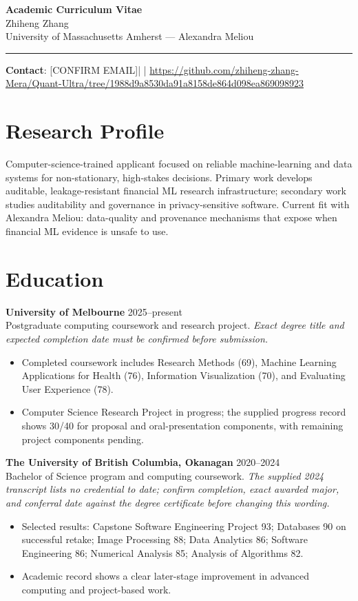 \documentclass[11pt]{article}
\newcommand{\ApplicantName}{Zhiheng Zhang}
\newcommand{\ApplicantEmail}{[CONFIRM EMAIL]}
\newcommand{\ApplicantPhone}{[CONFIRM PHONE]}
\newcommand{\ApplicantGitHub}{\url{https://github.com/zhiheng-zhang-Mera/Quant-Ultra/tree/1988d9a8530da91a8158de864d098ea869098923}}
\begin{document}
\begin{center}
{\LARGE\bfseries Academic Curriculum Vitae}\\[0.25em]
{\large \ApplicantName}\\
University of Massachusetts Amherst --- Alexandra Meliou
\end{center}
\vspace{0.35em}\hrule\vspace{0.65em}

\textbf{Contact}: \ApplicantEmail\quad | \quad \ApplicantPhone\quad | \quad \ApplicantGitHub

\section*{Research Profile}
Computer-science-trained applicant focused on reliable machine-learning and data systems for non-stationary, high-stakes decisions. Primary work develops auditable, leakage-resistant financial ML research infrastructure; secondary work studies auditability and governance in privacy-sensitive software. Current fit with Alexandra Meliou: data-quality and provenance mechanisms that expose when financial ML evidence is unsafe to use.

\section*{Education}
\textbf{University of Melbourne} \hfill 2025--present\\
Postgraduate computing coursework and research project. \textit{Exact degree title and expected completion date must be confirmed before submission.}
\begin{itemize}
\item Completed coursework includes Research Methods (69), Machine Learning Applications for Health (76), Information Visualization (70), and Evaluating User Experience (78).
\item Computer Science Research Project in progress; the supplied progress record shows 30/40 for proposal and oral-presentation components, with remaining project components pending.
\end{itemize}

\textbf{The University of British Columbia, Okanagan} \hfill 2020--2024\\
Bachelor of Science program and computing coursework. \textit{The supplied 2024 transcript lists no credential to date; confirm completion, exact awarded major, and conferral date against the degree certificate before changing this wording.}
\begin{itemize}
\item Selected results: Capstone Software Engineering Project 93; Databases 90 on successful retake; Image Processing 88; Data Analytics 86; Software Engineering 86; Numerical Analysis 85; Analysis of Algorithms 82.
\item Academic record shows a clear later-stage improvement in advanced computing and project-based work.
\end{itemize}
\end{document}
